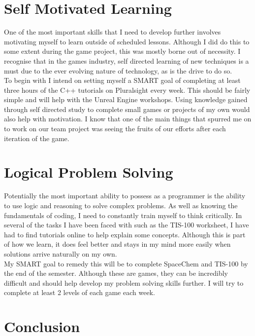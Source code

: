 \documentclass{scrartcl}
\begin{document}
\section{Self Motivated Learning}

One of the most important skills that I need to develop further involves motivating myself to learn outside of scheduled lessons. Although I did do this to some extent during the game project, this was mostly borne out of necessity. I recognise that in the games industry, self directed learning of new techniques is a must due to the ever evolving nature of technology, as is the drive to do so. 
\\
To begin with I intend on setting myself a SMART goal of completing at least three hours of the C++ tutorials on Pluralsight every week. This should be fairly simple and will help with the Unreal Engine workshops. Using knowledge gained through self directed study to complete small games or projects of my own would also help with motivation. I know that one of the main things that spurred me on to work on our team project was seeing the fruits of our efforts after each iteration of the game. 

\section{Logical Problem Solving}

Potentially the most important ability to possess as a programmer is the ability to use logic and reasoning to solve complex problems. As well as knowing the fundamentals of coding, I need to constantly train myself to think critically. In several of the tasks I have been faced with such as the TIS-100 worksheet, I have had to find tutorials online to help explain some concepts. Although this is part of how we learn, it does feel better and stays in my mind more easily when solutions arrive naturally on my own. 
\\
My SMART goal to remedy this will be to complete SpaceChem and TIS-100 by the end of the semester. Although these are games, they can be incredibly difficult and should help develop my problem solving skills further. I will try to complete at least 2 levels of each game each week.

\section{Conclusion}
\end{document}
